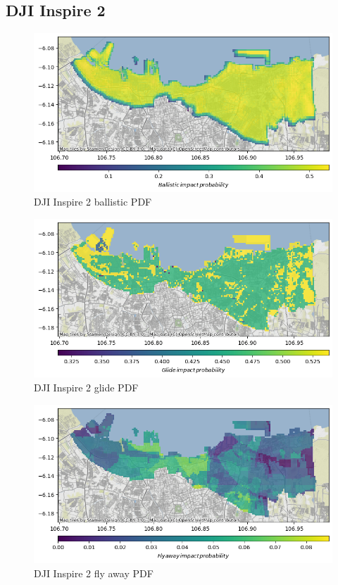 \documentclass[12pt]{report}
\begin{document}
        \subsection{DJI Inspire 2}
        \begin{figure}[H]
            \centering
            \includegraphics[width=\textwidth]{Plot/inspire/ballistic_pdf.png}
            \caption{DJI Inspire 2 ballistic PDF}
        \end{figure}
        \begin{figure}[H]
            \centering
            \includegraphics[width=\textwidth]{Plot/inspire/glide_pdf.png}
            \caption{DJI Inspire 2 glide PDF}
        \end{figure}
        \begin{figure}[H]
            \centering
            \includegraphics[width=\textwidth]{Plot/inspire/fly_away_pdf.png}
            \caption{DJI Inspire 2 fly away PDF}
        \end{figure}
\end{document}
